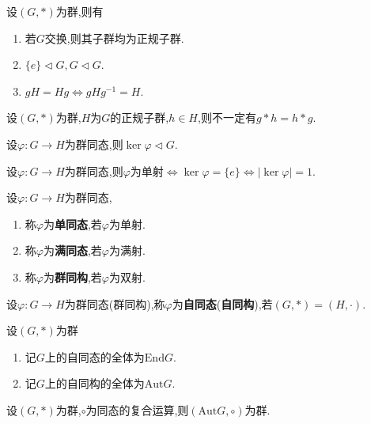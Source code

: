 \begin{prop}
    设$(G, *)$为群,则有
    \begin{enumerate}
        \item 若$G$交换,则其子群均为正规子群.
        \item $\{ e \} \lhd G, G \lhd G$.
        \item $gH = Hg \iff gHg^{-1} = H$.
    \end{enumerate}
\end{prop}

\begin{prop}
    设$(G, *)$为群,$H$为$G$的正规子群,$h \in H$,则不一定有$g * h = h * g$.
\end{prop}

\begin{prop}
    设$\varphi: G \to H$为群同态,则$\ker \varphi \lhd G$.
\end{prop}

\begin{prop}
    设$\varphi: G \to H$为群同态,则$\varphi$为单射$\iff \ker \varphi = \{ e \} \iff \lvert \ker \varphi \rvert = 1$.
\end{prop}

\begin{deff}
    设$\varphi: G \to H$为群同态,
    \begin{enumerate}
        \item 称$\varphi$为\textbf{单同态},若$\varphi$为单射.
        \item 称$\varphi$为\textbf{满同态},若$\varphi$为满射.
        \item 称$\varphi$为\textbf{群同构},若$\varphi$为双射.
    \end{enumerate}
\end{deff}

\begin{deff}
    设$\varphi: G \to H$为群同态(群同构),称$\varphi$为\textbf{自同态}(\textbf{自同构}),若$(G, *) = (H, \cdot)$.
\end{deff}

\begin{deff}
    设$(G, *)$为群
    \begin{enumerate}
        \item 记$G$上的自同态的全体为$\mathrm{End} G$.
        \item 记$G$上的自同构的全体为$\mathrm{Aut} G$.
    \end{enumerate}
\end{deff}

\begin{prop}
    设$(G, *)$为群,$\circ$为同态的复合运算,则$(\mathrm{Aut} G, \circ)$为群.
\end{prop}

